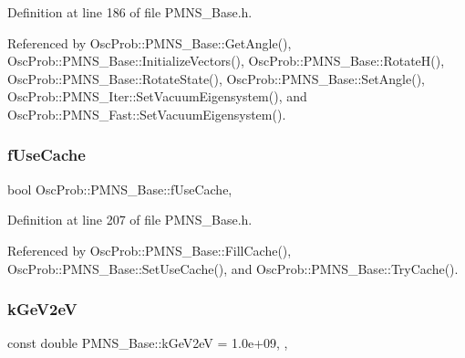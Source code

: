 Definition at line 186 of file P\+M\+N\+S\+\_\+\+Base.\+h.



Referenced by Osc\+Prob\+::\+P\+M\+N\+S\+\_\+\+Base\+::\+Get\+Angle(), Osc\+Prob\+::\+P\+M\+N\+S\+\_\+\+Base\+::\+Initialize\+Vectors(), Osc\+Prob\+::\+P\+M\+N\+S\+\_\+\+Base\+::\+Rotate\+H(), Osc\+Prob\+::\+P\+M\+N\+S\+\_\+\+Base\+::\+Rotate\+State(), Osc\+Prob\+::\+P\+M\+N\+S\+\_\+\+Base\+::\+Set\+Angle(), Osc\+Prob\+::\+P\+M\+N\+S\+\_\+\+Iter\+::\+Set\+Vacuum\+Eigensystem(), and Osc\+Prob\+::\+P\+M\+N\+S\+\_\+\+Fast\+::\+Set\+Vacuum\+Eigensystem().

\mbox{\label{classOscProb_1_1PMNS__Base_ad28c12ef897b5555eda509ea55c99107}} 
\subsubsection{\texorpdfstring{f\+Use\+Cache}{fUseCache}}
{\footnotesize\ttfamily bool Osc\+Prob\+::\+P\+M\+N\+S\+\_\+\+Base\+::f\+Use\+Cache\hspace{0.3cm}{\ttfamily [protected]}, {\ttfamily [inherited]}}



Definition at line 207 of file P\+M\+N\+S\+\_\+\+Base.\+h.



Referenced by Osc\+Prob\+::\+P\+M\+N\+S\+\_\+\+Base\+::\+Fill\+Cache(), Osc\+Prob\+::\+P\+M\+N\+S\+\_\+\+Base\+::\+Set\+Use\+Cache(), and Osc\+Prob\+::\+P\+M\+N\+S\+\_\+\+Base\+::\+Try\+Cache().

\mbox{\label{classOscProb_1_1PMNS__Base_ad36a0a6bf58d6ec093d3947784bd89e9}} 
\subsubsection{\texorpdfstring{k\+Ge\+V2eV}{kGeV2eV}}
{\footnotesize\ttfamily const double P\+M\+N\+S\+\_\+\+Base\+::k\+Ge\+V2eV = 1.\+0e+09\hspace{0.3cm}{\ttfamily [static]}, {\ttfamily [protected]}, {\ttfamily [inherited]}}



